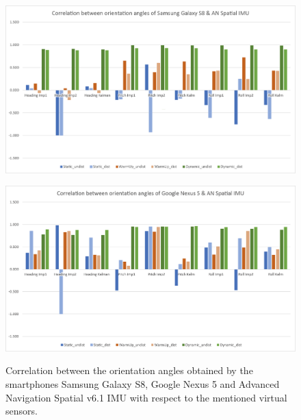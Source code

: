 \documentclass[review]{elsarticle}
\begin{document}
\begin{figure}[htbp!]
\begin{center}
	 	\begin{minipage}{\columnwidth}
	 		\centering
			\subfigure
			{\includegraphics[keepaspectratio, width=1\columnwidth]{graphics/sensor_correlation_s8_imu}\label{fig:sensor_sensi:imu_correlation_s8_nex5:s8}}
	 	\end{minipage} 
	 	\begin{minipage}{\columnwidth}
	 		\centering
			\subfigure 
			{\includegraphics[keepaspectratio, width=1\columnwidth]{graphics/sensor_correlation_nex5_imu}\label{fig:sensor_sensi:imu_correlation_s8_nex5:nex5}}
	 	\end{minipage}
		
		\caption{Correlation between the orientation angles obtained by the smartphones Samsung Galaxy S8, Google Nexus 5 and Advanced Navigation Spatial v6.1 \gls{IMU} with respect to the mentioned virtual sensors. }
	\label{fig:sensor_sensi:imu_correlation_s8_nex5}
\end{center}
\end{figure}
 
\end{document}
